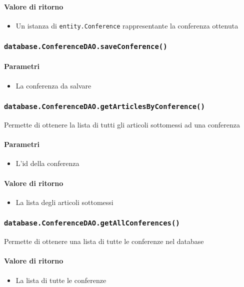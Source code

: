 \paragraph{Valore di ritorno}
\begin{itemize}
\item Un istanza di \texttt{entity.Conference} rappresentante la conferenza ottenuta
\end{itemize}

\subsubsection{\texttt{database.ConferenceDAO.saveConference()}}
\paragraph{Parametri}
\begin{itemize}
\item La conferenza da salvare
\end{itemize}

\subsubsection{\texttt{database.ConferenceDAO.getArticlesByConference()}}
Permette di ottenere la lista di tutti gli articoli sottomessi ad una conferenza
\paragraph{Parametri}
\begin{itemize}
\item L'id della conferenza
\end{itemize}
\paragraph{Valore di ritorno}
\begin{itemize}
\item La lista degli articoli sottomessi
\end{itemize}

\subsubsection{\texttt{database.ConferenceDAO.getAllConferences()}}
Permette di ottenere una lista di tutte le conferenze nel database
\paragraph{Valore di ritorno}
\begin{itemize}
\item La lista di tutte le conferenze
\end{itemize}

